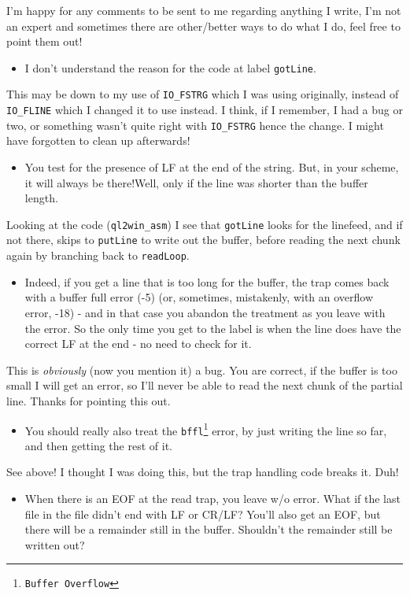 I'm happy for any comments to be sent to me regarding anything I write,
I'm not an expert and sometimes there are other/better ways to do
what I do, feel free to point them out!
\begin{itemize}
\item I don't understand the reason for the code at label \texttt{gotLine}.
\end{itemize}
This may be down to my use of \texttt{IO\_FSTRG} which I was using
originally, instead of \texttt{IO\_FLINE} which I changed it to use
instead. I think, if I remember, I had a bug or two, or something
wasn't quite right with \texttt{IO\_FSTRG} hence the change. I might
have forgotten to clean up afterwards!
\begin{itemize}
\item You test for the presence of LF at the end of the string. But, in
your scheme, it will always be there!Well, only if the line was shorter
than the buffer length. 
\end{itemize}
Looking at the code (\texttt{ql2win\_asm}) I see that \texttt{gotLine}
looks for the linefeed, and if not there, skips to \texttt{putLine}
to write out the buffer, before reading the next chunk again by branching
back to \texttt{readLoop}.
\begin{itemize}
\item Indeed, if you get a line that is too long for the buffer, the trap
comes back with a buffer full error (-5) (or, sometimes, mistakenly,
with an overflow error, -18) - and in that case you abandon the treatment
as you leave with the error. So the only time you get to the label
is when the line does have the correct LF at the end - no need to
check for it.
\end{itemize}
This is \emph{obviously} (now you mention it) a bug. You are correct,
if the buffer is too small I will get an error, so I'll never be able
to read the next chunk of the partial line. Thanks for pointing this
out. 
\begin{itemize}
\item You should really also treat the \texttt{bffl}\footnote{\texttt{Buffer Overflow}}
error, by just writing the line so far, and then getting the rest
of it.
\end{itemize}
See above! I thought I was doing this, but the trap handling code
breaks it. Duh!
\begin{itemize}
\item When there is an EOF at the read trap, you leave w/o error. What if
the last file in the file didn't end with LF or CR/LF? You'll also
get an EOF, but there will be a remainder still in the buffer. Shouldn't
the remainder still be written out?
\end{itemize}
